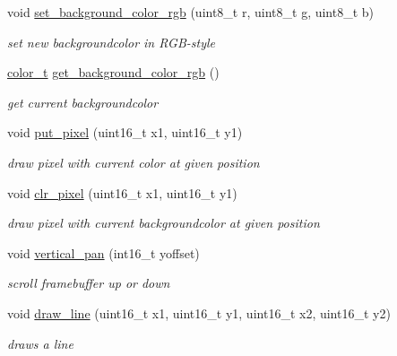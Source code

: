\begin{CompactItemize}
void \hyperlink{group__hgdi__api_g77a2bc7d1449fa4175ad4655437f90df}{set\_\-background\_\-color\_\-rgb} (uint8\_\-t r, uint8\_\-t g, uint8\_\-t b)
\begin{CompactList}\small\item\em set new backgroundcolor in RGB-style \item\end{CompactList}\item 
\hyperlink{group__hgdi__colors8_g2d1e492285f42b7772298f092243fe6b}{color\_\-t} \hyperlink{group__hgdi__api_gaff5b39ea1c26814023c4079e9cd91ea}{get\_\-background\_\-color\_\-rgb} ()
\begin{CompactList}\small\item\em get current backgroundcolor \item\end{CompactList}\item 
void \hyperlink{group__hgdi__api_ga56b1c619a3b3c381b9cc7ad9e66fb77}{put\_\-pixel} (uint16\_\-t x1, uint16\_\-t y1)
\begin{CompactList}\small\item\em draw pixel with current color at given position \item\end{CompactList}\item 
void \hyperlink{group__hgdi__api_g7f1f418ba1d392e2f8f2ea2bf346c2c0}{clr\_\-pixel} (uint16\_\-t x1, uint16\_\-t y1)
\begin{CompactList}\small\item\em draw pixel with current backgroundcolor at given position \item\end{CompactList}\item 
void \hyperlink{group__hgdi__api_gdae60538438e5266a1ca190a4f42107b}{vertical\_\-pan} (int16\_\-t yoffset)
\begin{CompactList}\small\item\em scroll framebuffer up or down \item\end{CompactList}\item 
void \hyperlink{group__hgdi__api_gd0d0faa6493f00905dc998f5b8833d46}{draw\_\-line} (uint16\_\-t x1, uint16\_\-t y1, uint16\_\-t x2, uint16\_\-t y2)
\begin{CompactList}\small\item\em draws a line \item\end{CompactList}\item 

\end{CompactItemize}
